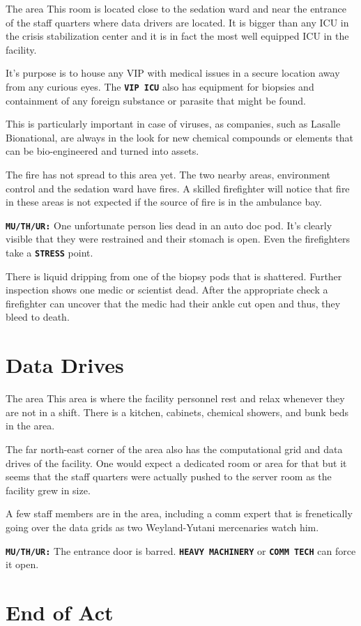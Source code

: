 \begin{rpg-commentbox}{The area}
    This room is located close to the sedation ward and near the entrance of the staff quarters where data drivers are located. It is bigger than any ICU in the crisis stabilization center and it is in fact the most well equipped ICU in the facility.

    It's purpose is to house any VIP with medical issues in a secure location away from any curious eyes. The \texttt{\textbf{VIP ICU}} also has equipment for biopsies and containment of any foreign substance or parasite that might be found. 

    This is particularly important in case of viruses, as companies, such as Lasalle Bionational, are always in the look for new chemical compounds or elements that can be bio-engineered and turned into assets.

    The fire has not spread to this area yet. The two nearby areas, environment control and the sedation ward have fires. A skilled firefighter will notice that fire in these areas is not expected if the source of fire is in the ambulance bay.

    \texttt{\textbf{MU/TH/UR:}} One unfortunate person lies dead in an auto doc pod.
    It's clearly visible that they were restrained and their stomach is open. Even the firefighters take a \texttt{\textbf{STRESS}} point.

    There is liquid dripping from one of the biopsy pods that is shattered. Further inspection shows one medic or scientist dead. After the appropriate check a firefighter can uncover that the medic had their ankle cut open and thus, they bleed to death. 
\end{rpg-commentbox}   



\section{Data Drives}

\begin{rpg-commentbox}{The area}
    This area is where the facility personnel rest and relax whenever they are not in a shift. There is a kitchen, cabinets, chemical showers, and bunk beds in the area. 
    
    The far north-east corner of the area also has the computational grid and data drives of the facility. One would expect a dedicated room or area for that but it seems that the staff quarters were actually pushed to the server room as the facility grew in size. 

    A few staff members are in the area, including a comm expert that is frenetically going over the data grids as two Weyland-Yutani mercenaries watch him. 

    \texttt{\textbf{MU/TH/UR:}} The entrance door is barred. \texttt{\textbf{HEAVY MACHINERY}} or \texttt{\textbf{COMM TECH}} can force it open. 
\end{rpg-commentbox}  



\section{End of Act}



